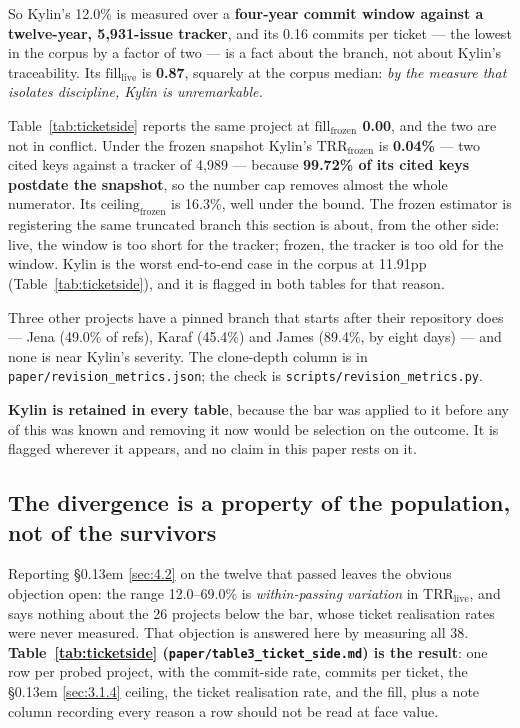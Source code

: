 \documentclass[11pt,a4paper]{article}
\begin{document}
So Kylin's 12.0\% is measured over a \textbf{four-year commit window against a twelve-year, 5,931-issue tracker}, and its 0.16 commits per ticket --- the lowest in the corpus by a factor of two --- is a fact about the branch, not about Kylin's traceability. Its $\mathrm{fill}_\mathrm{live}$ is \textbf{0.87}, squarely at the corpus median: \emph{by the measure that isolates discipline, Kylin is unremarkable.}

Table~\ref{tab:ticketside} reports the same project at \textbf{$\mathrm{fill}_\mathrm{frozen}$ 0.00}, and the two are not in conflict. Under the frozen snapshot Kylin's $\mathrm{TRR}_\mathrm{frozen}$ is \textbf{0.04\%} --- two cited keys against a tracker of 4,989 --- because \textbf{99.72\% of its cited keys postdate the snapshot}, so the number cap removes almost the whole numerator. Its $\mathrm{ceiling}_\mathrm{frozen}$ is 16.3\%, well under the bound. The frozen estimator is registering the same truncated branch this section is about, from the other side: live, the window is too short for the tracker; frozen, the tracker is too old for the window. Kylin is the worst end-to-end case in the corpus at 11.91pp (Table~\ref{tab:ticketside}), and it is flagged in both tables for that reason.

Three other projects have a pinned branch that starts after their repository does --- Jena (49.0\% of refs), Karaf (45.4\%) and James (89.4\%, by eight days) --- and none is near Kylin's severity. The clone-depth column is in \texttt{paper/\allowbreak{}revision\_\allowbreak{}metrics.\allowbreak{}json}; the check is \texttt{scripts/\allowbreak{}revision\_\allowbreak{}metrics.\allowbreak{}py}.

\textbf{Kylin is retained in every table}, because the bar was applied to it before any of this was known and removing it now would be selection on the outcome. It is flagged wherever it appears, and no claim in this paper rests on it.

\subsection{The divergence is a property of the population, not of the survivors}
\label{sec:4.3}

Reporting \S\kern0.13em \ref{sec:4.2} on the twelve that passed leaves the obvious objection open: the range 12.0--69.0\% is \emph{within-passing variation} in $\mathrm{TRR}_\mathrm{live}$, and says nothing about the 26 projects below the bar, whose ticket realisation rates were never measured. That objection is answered here by measuring all 38. \textbf{Table~\ref{tab:ticketside} (\texttt{paper/\allowbreak{}table3\_\allowbreak{}ticket\_\allowbreak{}side.\allowbreak{}md}) is the result}: one row per probed project, with the commit-side rate, commits per ticket, the \S\kern0.13em \ref{sec:3.1.4} ceiling, the ticket realisation rate, and the fill, plus a note column recording every reason a row should not be read at face value.
\end{document}
